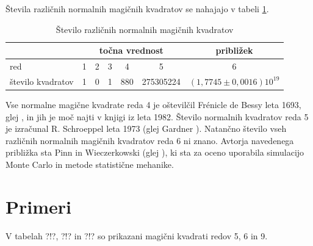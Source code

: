 \documentclass[a4paper,12pt]{article}
\theoremstyle{definition}
\theoremstyle{plain}
\begin{document}
Števila različnih normalnih magičnih kvadratov se nahajajo v tabeli \ref{table:stevila}.


\begin{table}
      \label{table:stevila}
      \caption{Število različnih normalnih magičnih kvadratov}
   \begin{tabular}{lcccccc}\toprule
      &  \multicolumn{5}{c}{točna vrednost} & približek \\
         \midrule
         red & 1 & 2 & 3 & 4 & 5 & 6\\
         število kvadratov & 1 & 0 & 1 & 880 & 275305224 & \( (1{,}7745 \pm 0{,}0016)10^{19} \)\\
         \bottomrule
   \end{tabular} 
\end{table}
      

Vse normalne magične kvadrate reda 4 je oštevilčil Frénicle de Bessy
leta 1693, glej \cite{bessy}, in jih je moč najti v knjigi \cite{berlekamp}
iz leta 1982. Število normalnih kvadratov reda 5 je izračunal
R. Schroeppel leta 1973 (glej Gardner \cite{gardner}).
Natančno število vseh različnih normalnih magičnih kvadratov reda 6 ni znano.
Avtorja navedenega približka sta Pinn in Wieczerkowski (glej \cite{pinn}), ki
sta za oceno uporabila simulacijo Monte Carlo in metode statistične mehanike.

\section{Primeri}

V tabelah ?!?, ?!? in ?!? so prikazani
magični kvadrati redov 5, 6 in 9.


\end{document}
